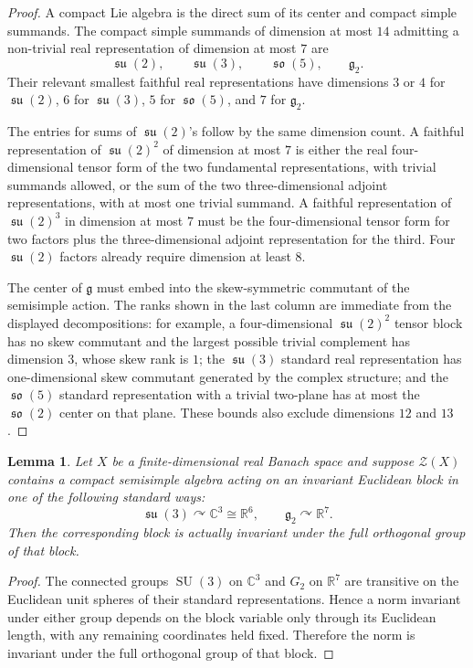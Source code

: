 \documentclass[11pt]{article}
\newtheorem{lemma}{Lemma}
\DeclareMathOperator{\SU}{SU}
\DeclareMathOperator{\so}{\mathfrak{so}}
\DeclareMathOperator{\su}{\mathfrak{su}}
\begin{document}
\begin{proof}
A compact Lie algebra is the direct sum of its center and compact simple
summands. The compact simple summands of dimension at most $14$ admitting a
non-trivial real representation of dimension at most $7$ are
\[
\su(2),\qquad \su(3),\qquad \so(5),\qquad \mathfrak g_2.
\]
Their relevant smallest faithful real representations have dimensions
$3$ or $4$ for $\su(2)$, $6$ for $\su(3)$, $5$ for $\so(5)$, and $7$ for
$\mathfrak g_2$.

The entries for sums of $\su(2)$'s follow by the same dimension count. A
faithful representation of $\su(2)^2$ of dimension at most $7$ is either the
real four-dimensional tensor form of the two fundamental representations,
with trivial summands allowed, or the sum of the two three-dimensional
adjoint representations, with at most one trivial summand. A faithful
representation of $\su(2)^3$ in dimension at most $7$ must be the
four-dimensional tensor form for two factors plus the three-dimensional
adjoint representation for the third. Four $\su(2)$ factors already require
dimension at least $8$.

The center of $\mathfrak g$ must embed into the skew-symmetric commutant of
the semisimple action. The ranks shown in the last column are immediate from
the displayed decompositions: for example, a four-dimensional
$\su(2)^2$ tensor block has no skew commutant and the largest possible
trivial complement has dimension $3$, whose skew rank is $1$; the
$\su(3)$ standard real representation has one-dimensional skew commutant
generated by the complex structure; and the $\so(5)$ standard representation
with a trivial two-plane has at most the $\so(2)$ center on that plane.
These bounds also exclude dimensions $12$ and $13$.
\end{proof}

\begin{lemma}\label{lem:sphere-transitive}
Let $X$ be a finite-dimensional real Banach space and suppose
$\mathcal Z(X)$ contains a compact semisimple algebra acting on an invariant
Euclidean block in one of the following standard ways:
\[
\su(3)\curvearrowright \mathbb C^3\cong\mathbb R^6,
\qquad
\mathfrak g_2\curvearrowright\mathbb R^7.
\]
Then the corresponding block is actually invariant under the full orthogonal
group of that block.
\end{lemma}

\begin{proof}
The connected groups $\SU(3)$ on $\mathbb C^3$ and $G_2$ on $\mathbb R^7$
are transitive on the Euclidean unit spheres of their standard
representations. Hence a norm invariant under either group depends on the
block variable only through its Euclidean length, with any remaining
coordinates held fixed. Therefore the norm is invariant under the full
orthogonal group of that block.
\end{proof}
\end{document}

